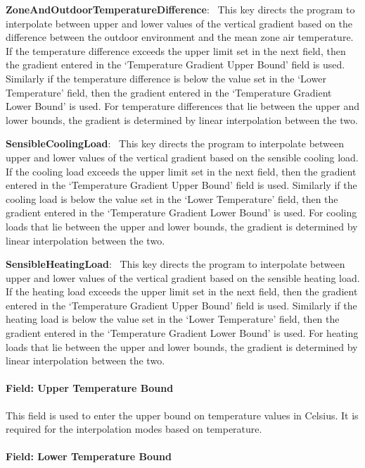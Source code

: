 \textbf{ZoneAndOutdoorTemperatureDifference}:~ This key directs the program to interpolate between upper and lower values of the vertical gradient based on the difference between the outdoor environment and the mean zone air temperature. If the temperature difference exceeds the upper limit set in the next field, then the gradient entered in the `Temperature Gradient Upper Bound' field is used. Similarly if the temperature difference is below the value set in the `Lower Temperature' field, then the gradient entered in the `Temperature Gradient Lower Bound' is used. For temperature differences that lie between the upper and lower bounds, the gradient is determined by linear interpolation between the two.

\textbf{SensibleCoolingLoad}:~ This key directs the program to interpolate between upper and lower values of the vertical gradient based on the sensible cooling load. If the cooling load exceeds the upper limit set in the next field, then the gradient entered in the `Temperature Gradient Upper Bound' field is used. Similarly if the cooling load is below the value set in the `Lower Temperature' field, then the gradient entered in the `Temperature Gradient Lower Bound' is used. For cooling loads that lie between the upper and lower bounds, the gradient is determined by linear interpolation between the two.

\textbf{SensibleHeatingLoad}:~ This key directs the program to interpolate between upper and lower values of the vertical gradient based on the sensible heating load. If the heating load exceeds the upper limit set in the next field, then the gradient entered in the `Temperature Gradient Upper Bound' field is used. Similarly if the heating load is below the value set in the `Lower Temperature' field, then the gradient entered in the `Temperature Gradient Lower Bound' is used. For heating loads that lie between the upper and lower bounds, the gradient is determined by linear interpolation between the two.

\paragraph{Field: Upper Temperature Bound}\label{field-upper-temperature-bound}

This field is used to enter the upper bound on temperature values in Celsius. It is required for the interpolation modes based on temperature.

\paragraph{Field: Lower Temperature Bound}\label{field-lower-temperature-bound}

